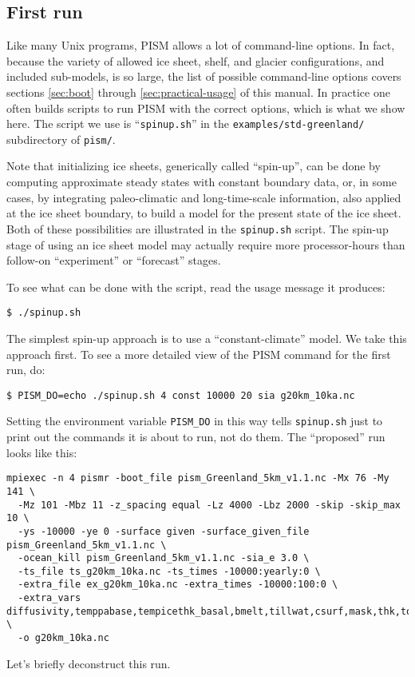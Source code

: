 \subsection{First run}   \label{subsect:runscript}  Like many Unix programs, PISM allows a lot of command-line options.  In fact, because the variety of allowed ice sheet, shelf, and glacier configurations, and included sub-models, is so large, the list of possible command-line options covers sections \ref{sec:boot} through \ref{sec:practical-usage} of this manual.  In practice one often builds scripts to run PISM with the correct options, which is what we show here.  The script we use is ``\texttt{spinup.sh}'' in the \texttt{examples/std-greenland/} subdirectory of \texttt{pism/}.

Note that initializing ice sheets, generically called ``spin-up'', can be done by computing approximate steady states with constant boundary data, or, in some cases, by integrating paleo-climatic and long-time-scale information, also applied at the ice sheet boundary, to build a model for the present state of the ice sheet.  Both of these possibilities are illustrated in the \texttt{spinup.sh} script.  The spin-up stage of using an ice sheet model may actually require more processor-hours than follow-on ``experiment'' or ``forecast'' stages.

To see what can be done with the script, read the usage message it produces:
\begin{verbatim}
$ ./spinup.sh
\end{verbatim}

The simplest spin-up approach is to use a ``constant-climate'' model.  We take this approach first.  To see a more detailed view of the PISM command for the first run, do:
\begin{verbatim}
$ PISM_DO=echo ./spinup.sh 4 const 10000 20 sia g20km_10ka.nc
\end{verbatim}
Setting the environment variable \texttt{PISM_DO} in this way tells \texttt{spinup.sh} just to print out the commands it is about to run, not do them.  The ``proposed'' run looks like this:
\label{firstcommand}
\small
\begin{verbatim}
mpiexec -n 4 pismr -boot_file pism_Greenland_5km_v1.1.nc -Mx 76 -My 141 \
  -Mz 101 -Mbz 11 -z_spacing equal -Lz 4000 -Lbz 2000 -skip -skip_max 10 \
  -ys -10000 -ye 0 -surface given -surface_given_file pism_Greenland_5km_v1.1.nc \
  -ocean_kill pism_Greenland_5km_v1.1.nc -sia_e 3.0 \
  -ts_file ts_g20km_10ka.nc -ts_times -10000:yearly:0 \
  -extra_file ex_g20km_10ka.nc -extra_times -10000:100:0 \
  -extra_vars diffusivity,temppabase,tempicethk_basal,bmelt,tillwat,csurf,mask,thk,topg,usurf \
  -o g20km_10ka.nc
\end{verbatim}
\normalsize
Let's briefly deconstruct this run.

